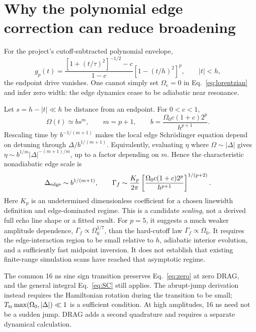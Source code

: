 \documentclass[11pt]{article}
\newcommand{\Om}{\Omega}
\begin{document}
\section{Why the polynomial edge correction can reduce broadening}
For the project's cutoff-subtracted polynomial envelope,
\begin{equation}
 g_p(t)=\frac{[1+(t/\tau)^2]^{-1/2}-c}{1-c}
         [1-(t/h)^2]^p,\qquad |t|<h,
\end{equation}
the endpoint drive vanishes. One cannot simply set $\Om_e=0$ in
Eq.~\eqref{eq:lorentzian} and infer zero width: the edge dynamics cease to
be adiabatic near resonance.

Let $s=h-|t|\ll h$ be distance from an endpoint. For $0<c<1$,
\begin{equation}
 \Om(t)\simeq b s^m,\qquad
 m=p+1,\qquad b=\frac{\Om_0c(1+c)2^p}{h^{p+1}}.
\end{equation}
Rescaling time by $b^{-1/(m+1)}$ makes the local edge Schr\"odinger
equation depend on detuning through $\Delta/b^{1/(m+1)}$. Equivalently,
evaluating $\eta$ where $\Om\sim|\Delta|$ gives
$\eta\sim b^{1/m}|\Delta|^{-(m+1)/m}$, up to a factor depending on $m$.
Hence the characteristic nonadiabatic edge scale is
\begin{equation}
 \Delta_{\rm edge}\sim b^{1/(m+1)},\qquad
 \Gamma_f\sim\frac{K_p}{2\pi}
 \left[\frac{\Om_0c(1+c)2^p}{h^{p+1}}\right]^{1/(p+2)}.
 \label{eq:poly}
\end{equation}
Here $K_p$ is an undetermined dimensionless coefficient for a chosen
linewidth definition and edge-dominated regime. This is a candidate
\emph{scaling}, not a derived full echo line shape or a fitted result.
For $p=5$, it suggests a much weaker amplitude dependence,
$\Gamma_f\propto\Om_0^{1/7}$, than the hard-cutoff law
$\Gamma_f\propto\Om_0$. It requires the edge-interaction region to be
small relative to $h$, adiabatic interior evolution, and a sufficiently
fast midpoint inversion. It does not establish that existing finite-range
simulation scans have reached that asymptotic regime.

The common 16 ns sine sign transition preserves Eq.~\eqref{eq:zero} at
zero DRAG, and the general integral Eq.~\eqref{eq:SC} still applies.
The abrupt-jump derivation instead requires the Hamiltonian rotation during
the transition to be small; $T_{\rm tr}\max(\Om_0,|\Delta|)\ll1$ is a
sufficient condition. At high amplitudes, 16 ns need not be a sudden jump.
DRAG adds a second quadrature and requires a separate dynamical calculation.
\end{document}
